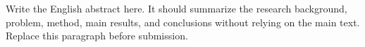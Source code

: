 \begin{abstract}
中文摘要应独立说明研究背景、研究问题、方法、主要结果和结论。删除本段并替换为实际摘要；通常不在摘要中插图、列表、公式编号或参考文献。
\end{abstract}

\begin{abstract*}
Write the English abstract here. It should summarize the research background,
problem, method, main results, and conclusions without relying on the main
text. Replace this paragraph before submission.
\end{abstract*}

